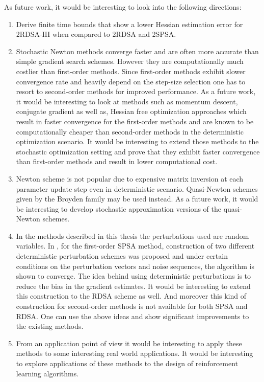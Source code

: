 As future work, it would be interesting to look into the following directions:
\begin{enumerate}
\item Derive finite time bounds that show a lower Hessian estimation error for 2RDSA-IH when compared to 2RDSA and 2SPSA. 
\item Stochastic Newton methods converge faster and  are often more accurate than simple gradient search schemes. However they are computationally much costlier than first-order methods. Since first-order methods exhibit slower convergence rate and heavily depend on the step-size selection one has to resort to second-order methods for improved performance. As a future work, it would be interesting to look at  methods such as momentum descent, conjugate gradient as well as, Hessian free optimization approaches which result in faster convergence for the first-order methods and are known to be computationally cheaper than second-order methods in the deterministic optimization scenario. It would be interesting to extend those methods to the stochastic optimization setting and prove that they exhibit  faster convergence than first-order methods and result in lower computational cost. 
\item Newton scheme is not popular due to expensive matrix inversion at each parameter update step even in deterministic scenario. Quasi-Newton schemes given by the Broyden family may be used instead. As a future work, it would be interesting to develop stochastic approximation versions of the quasi-Newton schemes.  
\item In the methods described in this thesis the perturbations used are random variables. In \cite{bhatnagar2003two}, for the first-order SPSA method,  construction of two different deterministic  perturbation schemes was proposed and  under certain conditions on the perturbation vectors and noise sequences, the algorithm is shown to converge. The idea behind using deterministic perturbations is to reduce the bias in the gradient estimates. It would be interesting to extend this construction to the RDSA scheme as well. And moreover this kind of construction for second-order methods is not available for both SPSA and RDSA. One can use the above ideas and show significant improvements to the existing methods.
\item From an application point of view it would be interesting to apply these methods to some interesting real world applications. It would be interesting to explore applications of  these methods  to the design of reinforcement learning algorithms.
\end{enumerate}